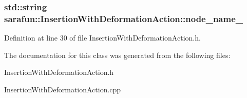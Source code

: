 \hypertarget{classsarafun_1_1InsertionWithDeformationAction_a493a532429347d18fa4d525d982c0204_a493a532429347d18fa4d525d982c0204}{
\subsubsection[{node\-\_\-name\-\_\-}]{\setlength{\rightskip}{0pt plus 5cm}std\-::string sarafun\-::\-Insertion\-With\-Deformation\-Action\-::node\-\_\-name\-\_\-\hspace{0.3cm}{\ttfamily [private]}}}\label{classsarafun_1_1InsertionWithDeformationAction_a493a532429347d18fa4d525d982c0204_a493a532429347d18fa4d525d982c0204}


Definition at line 30 of file Insertion\-With\-Deformation\-Action.\-h.



The documentation for this class was generated from the following files\-:\begin{DoxyCompactItemize}
\item 
Insertion\-With\-Deformation\-Action.\-h\item 
Insertion\-With\-Deformation\-Action.\-cpp\end{DoxyCompactItemize}
